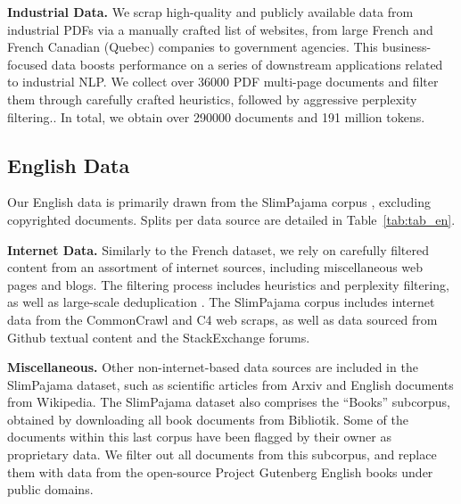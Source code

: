 \textbf{Industrial Data.} We scrap high-quality and publicly available data from industrial PDFs via a manually crafted list of websites, from large French and French Canadian (Quebec) companies to government agencies. This business-focused data boosts performance on a series of downstream applications related to industrial NLP. We collect over 36000 PDF multi-page documents and filter them through carefully crafted heuristics, followed by aggressive perplexity filtering..
In total, we obtain over 290000 documents and 191 million tokens. 

\subsection{English Data}

Our English data is primarily drawn from the SlimPajama corpus , excluding copyrighted documents.
Splits per data source are detailed in Table~\ref{tab:tab_en}. 

\textbf{Internet Data.} Similarly to the French dataset, we rely on carefully filtered content from an assortment of internet sources, including miscellaneous web pages and blogs. The filtering process includes heuristics and perplexity filtering, as well as large-scale deduplication . The SlimPajama corpus includes internet data from the CommonCrawl and C4 web scraps, as well as data sourced from Github textual content and the StackExchange forums.

\textbf{Miscellaneous.} Other non-internet-based data sources are included in the SlimPajama dataset, such as scientific articles from Arxiv and English documents from Wikipedia. The SlimPajama dataset also comprises the ``Books'' subcorpus, obtained by downloading all book documents from Bibliotik.
Some of the documents within this last corpus have been flagged by their owner as proprietary data. We filter out all documents from this subcorpus, and replace them with data from the open-source Project Gutenberg  English books under public domains.

